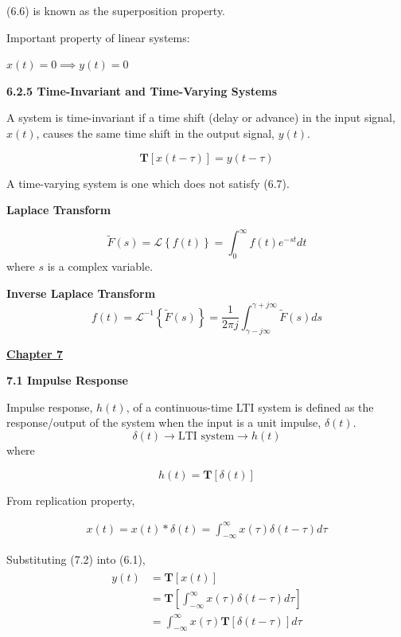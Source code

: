 \documentclass[landscape,a4paper]{extarticle}
\newcommand{\T}{\textbf{T}}
\newcommand{\lap}[1]{\mathcal{L}\left\{#1\right\}}
\newcommand{\invlap}[1]{\mathcal{L}^{-1}\left\{#1\right\}}
\begin{document}
\begin{multicols*}{5}
    (6.6) is known as the superposition property.

    Important property of linear systems: 
    
    $x(t) = 0 \implies y(t) = 0$

    \textbf{6.2.5 Time-Invariant and Time-Varying Systems}

    A system is time-invariant if a time shift (delay or advance) in the input signal, $x(t)$, causes the same time shift in the output signal, $y(t)$.

    \[
        \T[x(t-\tau)] = y(t-\tau) \tag{6.7}
    \]

    A time-varying system is one which does not satisfy (6.7).

    \textbf{Laplace Transform}

    \[
        \tilde{F}(s) = \lap{f(t)} = \int_{0}^{\infty}f(t)e^{-st} dt \tag{6.8}
    \]
    where $s$ is a complex variable.

    \textbf{Inverse Laplace Transform}
    \[
        f(t) = \invlap{\tilde{F}(s)} = \frac{1}{2\pi j} \int_{\gamma - j \infty}^{\gamma + j \infty}\tilde{F}(s)ds \tag{6.9}
    \]
    

    \textbf{\uline{Chapter 7}}

    \textbf{7.1 Impulse Response}

    Impulse response, $h(t)$, of a continuous-time LTI system is defined as the response/output of the system when the input is a unit impulse, $\delta(t)$.
    \[
        \delta(t) \rightarrow \text{LTI system} \rightarrow h(t)
    \]
    where 

    \[
        h(t) = \T[\delta(t)] \tag{7.1}
    \]

    From replication property, 

    \begin{align*}
        x(t) = x(t) * \delta (t) = \int_{-\infty}^{\infty}x(\tau)\delta(t-\tau) d\tau \tag{7.2}
    \end{align*}

    Substituting (7.2) into (6.1), 
    \begin{align*}
        \begin{split}
            y(t) &= \T[x(t)]\\
            &= \T\left[\int_{-\infty}^{\infty}x(\tau)\delta(t-\tau) d\tau\right]\\
            &= \int_{-\infty}^{\infty}x(\tau)\T[\delta(t-\tau)]d\tau
        \end{split} \tag{7.3}
    \end{align*}


\end{multicols*}
\end{document}
